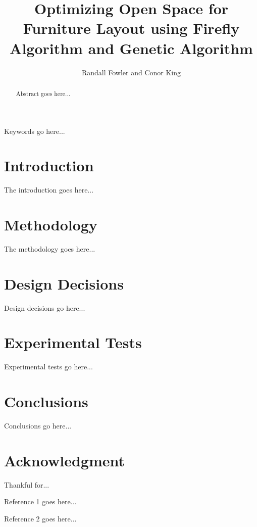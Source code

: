 \documentclass[conference]{IEEEtran}
\begin{document}
\graphicspath{{figures/}} %

\title{Optimizing Open Space for Furniture Layout using Firefly Algorithm and Genetic Algorithm}

\author{
    Randall Fowler and Conor King
}

\maketitle

\begin{abstract}
Abstract goes here...
\end{abstract}

\begin{IEEEkeywords}
Keywords go here...
\end{IEEEkeywords}

\section{Introduction}
The introduction goes here...

\section{Methodology}
The methodology goes here...

\section{Design Decisions}
Design decisions go here...

\section{Experimental Tests}
Experimental tests go here...

\section{Conclusions}
Conclusions go here...

\section*{Acknowledgment}
Thankful for...

\begin{thebibliography}{1}
    
    
    Reference 1 goes here...
    
    Reference 2 goes here...
    
\end{thebibliography}
\end{document}
